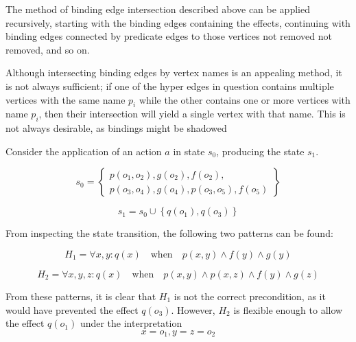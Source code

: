 \documentclass[../Master.tex]{subfiles}
\begin{document}
The method of binding edge intersection described above can be applied recursively, starting with the binding edges containing the effects, continuing with binding edges connected by predicate edges to those vertices not removed not removed, and so on.

Although intersecting binding edges by vertex names is an appealing method, it is not always sufficient; if one of the hyper edges in question contains multiple vertices with the same name $p_i$ while the other contains one or more vertices with name $p_i$, then their intersection will yield a single vertex with that name. This is not always desirable, as bindings might be shadowed 

\begin{example} \label{ex:ca:hgma:generalization}
	Consider the application of an action $a$ in state $s_0$, producing the state $s_1$.

	\begin{equation*}
		s_0 = \left\{
			\begin{gathered}
				p(o_1, o_2), g(o_2), f(o_2), \\
				p(o_3, o_4), g(o_4), p(o_3, o_5), f(o_5)
			\end{gathered}
		\right\}
	\end{equation*}

	\begin{equation*}
		s_1 = s_0 \cup \left\{ q\left( o_1 \right), q \left( o_3 \right) \right\}
	\end{equation*}

	From inspecting the state transition, the following two patterns can be found:

    \begin{equation*}
        H_1 = \forall x, y : q(x) \quad \text{when} \quad
            p(x,y) \land f(y) \land g(y)
    \end{equation*}

    \begin{equation*}
        H_2 = \forall x, y, z : q(x) \quad \text{when} \quad
            p(x, y) \land p(x,z) \land f(y) \land g(z)
    \end{equation*}

	From these patterns, it is clear that $H_1$ is not the correct precondition, as it would have prevented the effect $q\left(o_3\right)$. However, $H_2$ is flexible enough to allow the effect $q\left(o_1\right)$ under the interpretation 
	\begin{equation*}
		x = o_1, y = z = o_2
	\end{equation*}


\end{example}
\end{document}
